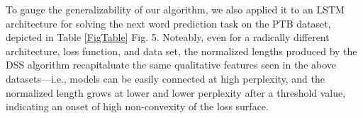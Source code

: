  To gauge the generalizability of our algorithm, we also applied it to an LSTM architecture for solving the next word prediction task on the PTB dataset, depicted in Table \ref{FigTable} Fig. 5.  Noteably, even for a radically different architecture, loss function, and data set, the normalized lengths produced by the DSS algorithm recapitaluate the same qualitative features seen in the above datasets---i.e., models can be easily connected at high perplexity, and the normalized length grows at lower and lower perplexity after a threshold value, indicating an onset of high non-convexity of the loss surface. 



